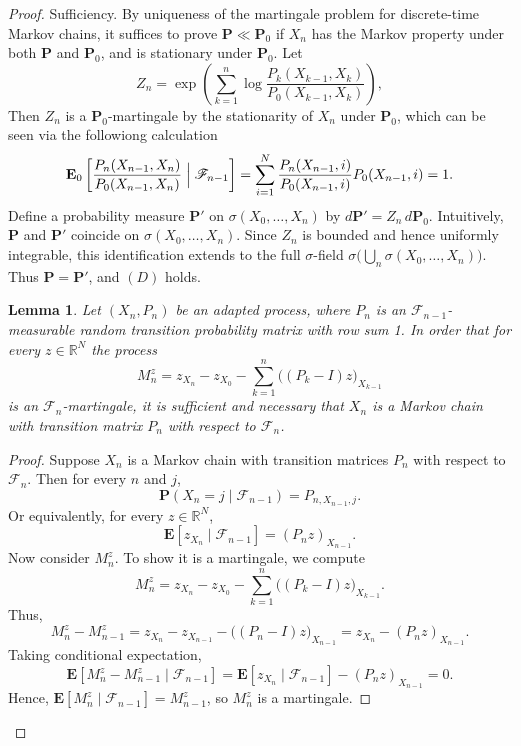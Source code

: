 \documentclass{lms}
\newtheorem{lemma}[theorem]{Lemma}     %
\begin{document}
\begin{proof} Sufficiency. By uniqueness of the martingale problem for discrete-time Markov chains, it suffices to prove $\mathbf P \ll \mathbf P_0$ if $X_n$ has the Markov property under both $\mathbf P$ and $\mathbf P_0$, and is stationary under $\mathbf P_0$.  Let 
\[Z_n = \exp\left(\sum_{k=1}^{n} \log \frac{P_{k}(X_{k-1},X_{k})}{P_{0}(X_{k-1},X_{k})}
    \right),\]
Then $Z_n$ is a $\mathbf P_0$-martingale by the stationarity of $X_n$ under $\mathbf P_0$, which can be seen via the followiong calculation
$$\mathbf E_{0}\left[\frac{P_{n}(X_{n-1},X_{n})}{P_{0}(X_{n-1},X_{n})}\Bigm|\mathscr F_{n-1}\right]   =\sum_{i=1}^N\frac{P_{n}(X_{n-1},i)}{P_{0}(X_{n-1},i)}P_0(X_{n-1},i)=1.   $$
Define a probability measure $\mathbf P'$ on $\sigma(X_0,\dots,X_n)$ by $d\mathbf P' = Z_n \, d\mathbf P_0$. Intuitively, $\mathbf P$ and $\mathbf P'$ coincide on $\sigma(X_{0},\dots,X_{n})$. Since $Z_n$ is bounded and hence uniformly integrable, this identification extends to the full $\sigma$-field $\sigma\big(\bigcup_n \sigma(X_{0},\dots,X_{n})\big)$. Thus $\mathbf P = \mathbf P'$, and $(D)$ holds.

    \begin{lemma}
        Let $(X_n, P_n)$ be an adapted process, where $P_n$ is an $\mathscr F_{n-1}$-measurable random transition probability matrix with row sum 1. In order that for every $z \in \mathbb R^N$ the process
        \begin{equation}
            M_n^z = z_{X_n} - z_{X_0} - \sum_{k=1}^{n} \big( (P_k - I)z\big)_{X_{k-1}}
            \label{eq: Markov martingale}
        \end{equation}
        is an  $\mathscr F_n$-martingale, it is sufficient and necessary that $X_n$ is a Markov chain with transition matrix $P_n$ with respect to $\mathscr F_n$. 
        \end{lemma}
    \begin{proof} Suppose $X_n$ is a Markov chain with transition matrices $P_n$ with respect to $\mathscr F_n$. Then for every $n$ and $j$,
    $$\mathbf P(X_{n} = j \mid \mathscr F_{n-1}) = P_{n, X_{n-1}, j}.$$
    Or equivalently, for every $z \in \mathbb R^N$,
    $$\mathbf E[z_{X_{n}} \mid \mathscr F_{n-1}] = (P_{n} z)_{X_{n-1}}.$$
    Now consider $M_n^z$. To show it is a martingale, we compute
    $$M_{n}^z = z_{X_{n}} - z_{X_0} - \sum_{k=1}^{n} \big( (P_k-I) z\big)_{X_{k-1}}.$$
    Thus,
    $$M_{n}^z - M_{n-1}^z = z_{X_{n}} - z_{X_{n-1}} -\big( (P_{n}-I) z\big)_{X_{n-1}} = z_{X_{n}} - (P_{n} z)_{X_{n-1}}.$$
    Taking conditional expectation,
    $$\mathbf E[M_{n}^z - M_{n-1}^z \mid \mathscr F_{n-1}] = \mathbf E[z_{X_{n}} \mid \mathscr F_{n-1}] - (P_{n} z)_{X_{n-1}} = 0.$$
    Hence, $\mathbf E[M_{n}^z \mid \mathscr F_{n-1}] = M_{n-1}^z$, so $M_n^z$ is a martingale.


\end{proof}
\end{proof}
\end{document}

